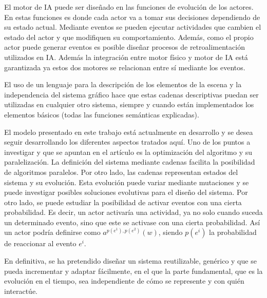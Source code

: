 \documentclass{egpubl}
\begin{document}
El motor de IA puede ser dise\~nado en las funciones de evoluci\'on de los actores. En estas funciones es donde cada actor va a tomar sus decisiones dependiendo de su estado actual. Mediante eventos se pueden ejecutar actividades que cambien el estado del actor y que modifiquen su comportamiento. Adem\'as, como el propio actor puede generar eventos es posible dise\~nar procesos de retroalimentaci\'on utilizados en IA. Adem\'as la integraci\'on entre motor f\'isico y motor de IA est\'a garantizada ya estos dos motores se relacionan entre s\'i mediante los eventos.

El uso de un lenguaje para la descripci\'on de los elementos de la escena y la independencia del sistema gr\'afico hace que estas cadenas descriptivas puedan ser utilizadas en cualquier otro sistema, siempre y cuando est\'an implementados los elementos b\'asicos (todas las funciones sem\'anticas explicadas).

El modelo presentado en este trabajo est\'a actualmente en desarrollo y se desea
seguir desarrollando los diferentes aspectos tratados aqu\'i. Uno de los puntos a 
investigar y que se apuntan en el art\'iculo es la optimizaci\'on del algoritmo
y su paralelizaci\'on. La definici\'on del sistema mediante cadenas facilita
la posibilidad de algoritmos paralelos. Por otro lado, las cadenas representan
estados del sistema y su evoluci\'on. Esta evoluci\'on puede variar mediante 
mutaciones y se puede investigar posibles soluciones evolutivas para el dise\~no del sistema.
Por otro lado, se puede estudiar la posibilidad de activar eventos con una cierta
probabilidad. Es decir, un actor activar\'ia una actividad, ya no solo cuando
suceda un determinado evento, sino que este se activase con una cierta probabilidad.
As\'i un actor podr\'ia definirse como $a^{p(e^{1}),p(e^{2})}(w)$, siendo $p(e^{i})$ la probabilidad
de reaccionar al evento $e^{i}$.

En definitiva, se ha pretendido dise\~nar un sistema reutilizable, gen\'erico y que se pueda incrementar 
y adaptar f\'acilmente, en el que la parte fundamental, que es la evoluci\'on en el tiempo, sea independiente 
de c\'omo se represente y con qui\'en interact\'ue.






%
\end{document}
